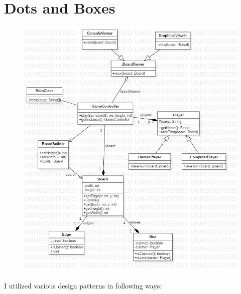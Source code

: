 \documentclass{article}
\begin{document}
    \section{Dots and Boxes}
    \begin{figure}[h!]
        \includegraphics[width=\linewidth]{class_diagram.png}
    \end{figure}
    I utilized various design patterns in following ways:
\end{document}
